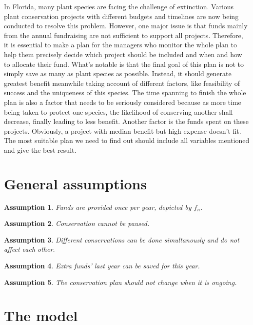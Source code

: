 \documentclass{article}
\newtheorem{assumption}{Assumption}
\begin{document}
In Florida, many plant species are facing the challenge of extinction.
Various plant conservation projects with different budgets and timelines are now being conducted to resolve this problem.
However, one major issue is that funds mainly from the annual fundraising are not sufficient to support all projects.
Therefore, it is essential to make a plan for the managers who monitor the whole plan to help them precisely decide which project should be included and when and how to allocate their fund.
What's notable is that the final goal of this plan is not to simply save as many as plant species as possible.
Instead, it should generate greatest benefit meanwhile taking account of different factors, like feasibility of success and the uniqueness of this species.  
The time spanning to finish the whole plan is also a factor that needs to be seriously considered because as more time being taken to protect one species, the likelihood of conserving another shall decrease, finally leading to less benefit.
Another factor is the funds spent on these projects.
Obviously, a project with median benefit but high expense doesn’t fit. 
The most suitable plan we need to find out should include all variables mentioned and give the best result.


\section{General assumptions}

\begin{assumption}
Funds are provided once per year, depicted by $f_n$.
\end{assumption}

\begin{assumption}
	Conservation cannot be paused.
\end{assumption}
\begin{assumption}
	Different conservations can be done simultanously and do not affect each other.
\end{assumption}
\begin{assumption}
	Extra funds' last year can be saved for this year.
\end{assumption}
\begin{assumption}
	The conservation plan should not change when it is ongoing.	
\end{assumption}


\section{The model}
\label{sec:model}
\end{document}
